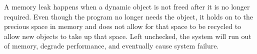 A memory leak happens when a dynamic object is not freed after it is no longer
required. Even though the program no longer needs the object, it holds on to the
precious space in memory and does not allow for that space to be recycled to
allow new objects to take up that space. Left unchecked, the system will run out
of memory, degrade performance, and eventually cause system failure.
